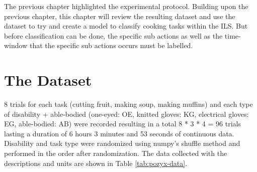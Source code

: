 
The previous chapter highlighted the experimental protocol. Building upon the previous chapter, this chapter will review the resulting dataset and use the dataset to try and create a model to classify cooking tasks within the ILS. But before classification can be done, the specific sub actions as well as the time-window that the specific sub actions occurs must be labelled. 

\section{The Dataset}

8 trials for each task (cutting fruit, making soup, making muffins) and each type of disability + able-bodied (one-eyed: OE, knitted gloves: KG, electrical gloves: EG, able-bodied: AB) were recorded resulting in a total 8 * 3 * 4 = 96 trials lasting a duration of 6 hours 3 minutes and 53 seconds of continuous data. Disability and task type were randomized using numpy's shuffle method and performed in the order after randomization. The data collected with the descriptions and units are shown in Table \ref{tab:pozyx-data}.

